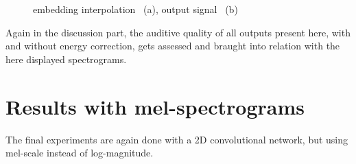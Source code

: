 \begin{figure}[htb!]
    \centering
    \caption{embedding interpolation ~(a), output signal ~(b)}
    \label{fig:res_triple_str_2D_inter_output}
\end{figure}

Again in the discussion part, the auditive quality of all outputs present here, with and without energy correction, gets assessed and braught into relation with the here displayed spectrograms.

\section{Results with mel-spectrograms}

The final experiments are again done with a 2D convolutional network, but using mel-scale instead of log-magnitude. 

